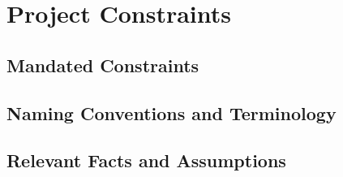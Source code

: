 \section{Project Constraints}

\subsection{Mandated Constraints}

\subsection{Naming Conventions and Terminology}

\subsection{Relevant Facts and Assumptions}